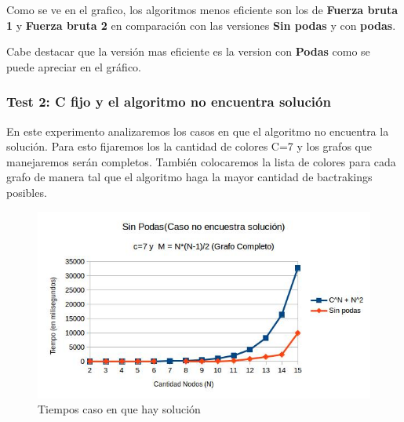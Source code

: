 Como se ve en el grafico, los algoritmos menos eficiente son los de  \textbf{Fuerza bruta 1} y \textbf{Fuerza bruta 2} en comparación con las  versiones \textbf{Sin podas} y con \textbf{podas}. \newline
 
Cabe destacar que la versión mas eficiente es la version con \textbf{Podas} como se puede apreciar en el gráfico. 
 

\vspace*{0.3cm}

\subsubsection{Test 2: C fijo y el algoritmo no encuentra solución}

En este experimento analizaremos los casos en que  el algoritmo no encuentra la solución. Para esto fijaremos los la cantidad de colores C=7 y los grafos  que manejaremos serán completos. También colocaremos la lista de colores para cada grafo de manera tal que el algoritmo haga la mayor cantidad de bactrakings posibles.   



\begin{figure}[htb]
  \begin{center}
      \includegraphics[scale=0.60]{imagenes/imgEjercicio2/CNESSinPodas-noSolucion.jpg}
  \end{center}
  \caption{Tiempos caso en que hay solución}
\end{figure}


